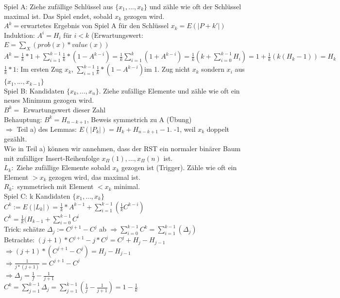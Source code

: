 \documentclass[a4paper]{article}
\begin{document}
Spiel A: Ziehe zufällige Schlüssel aus $\{x_1,...,x_k\}$ und zähle wie oft der Schlüssel maximal ist. Das Spiel endet, sobald $x_k$ gezogen wird.\\
$A^k = $erwartetes Ergebnis von Spiel A für den Schlüssel $x_k = E(|P+k'|)$\\
Induktion: $A^i = H_i$ für $i<k$ (Erwartungswert: $E=\sum_{X}(prob(x)*value(x))$\\
$A^k = \frac{1}{k}*1 + \sum_{i=1}^{k-1}\frac{1}{k}*(1-A^{k-i}) = \frac{1}{k}\sum_{i=1}^k(1+A^{k-i})=\frac{1}{k}(k+\sum_{i=0}^{k-1} H_i)= 1+\frac{1}{k}(k(H_k -1)) = H_k$\\
$\frac{1}{k}*1$: Im ersten Zug $x_k$, $ \sum_{i=1}^{k-1}\frac{1}{k}*(1-A^{k-i})$im 1. Zug nicht $x_k$ sondern $x_i$ aus $\{x_1,...,x_{k-1}\}$\\
Spiel B: Kandidaten $\{x_k,...,x_n\}$. Ziehe zufällige Elemente und zähle wie oft ein neues Minimum gezogen wird.\\
$B^k = $ Erwartungswert dieser Zahl\\
Behauptung: $B^k = H_{n-k+1}$, Beweis symmetrich zu A (Übung)\\
$\Rightarrow$ Teil a) des Lemmas: $E(|P_k|)=H_k+ H_{n-k+1} -1$. -1, weil $x_k$ doppelt gezählt.\\
Wie in Teil a) können wir annehmen, dass der RST ein normaler binärer Baum mit zufälliger Insert-Reihenfolge $x_\Pi(1),...,x_\Pi(n)$ ist.\\
$L_k:$ Ziehe zufällige Elemente sobald $x_k$ gezogen ist (Trigger). Zähle wie oft ein Element $> x_k$ gezogen wird, das maximal ist.\\
$R_k:$ symmetrisch mit Element $<x_k$ minimal.\\
Spiel C: k Kandidaten $\{x_1,...,x_k\}$\\
$C^k := E(|L_k|) = \frac{1}{k} * A^{k-1}+\sum_{i=1}^{k-1}(\frac{1}{k}C^{k-i})$\\
$C^k = \frac{1}{k}(H_{k-1} + \sum_{i=0}^{k-1}C^i$\\
Trick: schätze $\Delta_j := C^{j+1} -C^j$ ab $\Rightarrow \sum_{i=0}^{k-1}C^k = \sum_{i=1}^{k-1}(\Delta_j)$\\
Betrachte: $(j+1)*C^{j+1}-j*C^j = C^j +H_j-H_{j-1}$\\
$\Rightarrow (j+1)*(C^{j+1}-C^j) = H_j - H_{j-1}$\\
$\Rightarrow \frac{1}{j*(j+1)}=C^{j+1}-C^j$\\
$\Rightarrow \Delta_j = \frac{1}{f}-\frac{1}{j+1}$\\
$C^k = \sum_{j=1}^{k-1}\Delta_j = \sum_{j=1}^{k-1}(\frac{1}{j}-\frac{1}{j+1}) = 1-\frac{1}{k}$\\
\end{document}
